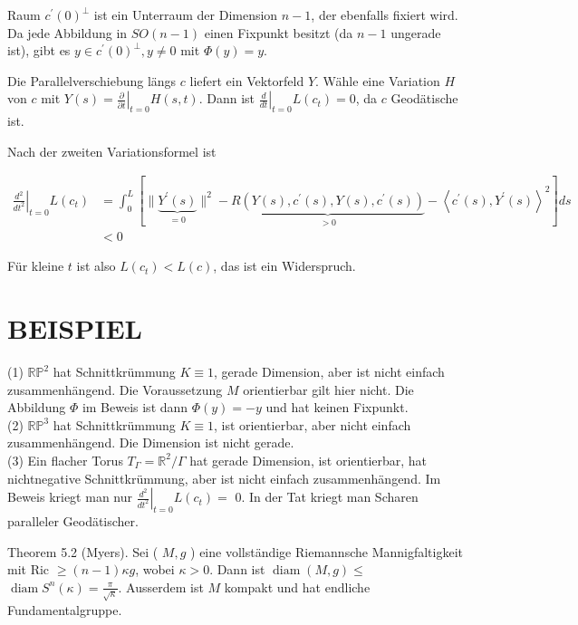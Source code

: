 \documentclass[10pt]{article}
\begin{document}
Raum $c^{\prime}(0)^{\perp}$ ist ein Unterraum der Dimension $n-1$, der ebenfalls fixiert wird. Da jede Abbildung in $S O(n-1)$ einen Fixpunkt besitzt (da $n-1$ ungerade ist), gibt es $y \in c^{\prime}(0)^{\perp}, y \neq 0$ mit $\Phi(y)=y$.

Die Parallelverschiebung längs $c$ liefert ein Vektorfeld $Y$. Wähle eine Variation $H$ von $c$ mit $Y(s)=\left.\frac{\partial}{\partial t}\right|_{t=0} H(s, t)$. Dann ist $\left.\frac{d}{d t}\right|_{t=0} L\left(c_{t}\right)=0$, da $c$ Geodätische ist.

Nach der zweiten Variationsformel ist

$$
\begin{aligned}
\left.\frac{d^{2}}{d t^{2}}\right|_{t=0} L\left(c_{t}\right) & =\int_{0}^{L}[\|\underbrace{Y^{\prime}(s)}_{=0}\|^{2}-\underbrace{R\left(Y(s), c^{\prime}(s), Y(s), c^{\prime}(s)\right)}_{>0}-\left\langle c^{\prime}(s), Y^{\prime}(s)\right\rangle^{2}] d s \\
& <0
\end{aligned}
$$

Für kleine $t$ ist also $L\left(c_{t}\right)<L(c)$, das ist ein Widerspruch.

\section*{BEISPIEL}
(1) $\mathbb{R} \mathbb{P}^{2}$ hat Schnittkrümmung $K \equiv 1$, gerade Dimension, aber ist nicht einfach zusammenhängend. Die Voraussetzung $M$ orientierbar gilt hier nicht. Die Abbildung $\Phi$ im Beweis ist dann $\Phi(y)=-y$ und hat keinen Fixpunkt.\\
(2) $\mathbb{R} \mathbb{P}^{3}$ hat Schnittkrümmung $K \equiv 1$, ist orientierbar, aber nicht einfach zusammenhängend. Die Dimension ist nicht gerade.\\
(3) Ein flacher Torus $T_{\Gamma}=\mathbb{R}^{2} / \Gamma$ hat gerade Dimension, ist orientierbar, hat nichtnegative Schnittkrümmung, aber ist nicht einfach zusammenhängend. Im Beweis kriegt man nur $\left.\frac{d^{2}}{d t^{2}}\right|_{t=0} L\left(c_{t}\right)=$ 0. In der Tat kriegt man Scharen paralleler Geodätischer.

Theorem 5.2 (Myers). Sei ( $M, g$ ) eine vollständige Riemannsche Mannigfaltigkeit mit Ric $\geq(n-1) \kappa g$, wobei $\kappa>0$. Dann ist $\operatorname{diam}(M, g) \leq$ $\operatorname{diam} S^{n}(\kappa)=\frac{\pi}{\sqrt{\kappa}}$. Ausserdem ist $M$ kompakt und hat endliche Fundamentalgruppe.
\end{document}
